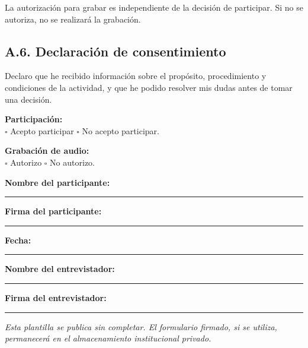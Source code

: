\documentclass[12pt,a4paper]{article}
\begin{document}
La autorización para grabar es independiente de la decisión
de participar. Si no se autoriza, no se realizará la grabación.

\subsection*{A.6. Declaración de consentimiento}

Declaro que he recibido información sobre el propósito,
procedimiento y condiciones de la actividad, y que he podido
resolver mis dudas antes de tomar una decisión.

\vspace{0.3cm}

\noindent\textbf{Participación:}\\[0.15cm]
$\square$ Acepto participar \qquad
$\square$ No acepto participar.

\vspace{0.3cm}

\noindent\textbf{Grabación de audio:}\\[0.15cm]
$\square$ Autorizo \qquad
$\square$ No autorizo.

\vspace{0.15cm}

\noindent\textbf{Nombre del participante:}
\rule{7cm}{0.4pt}

\vspace{0.15cm}

\noindent\textbf{Firma del participante:}
\rule{7.3cm}{0.4pt}

\vspace{0.15cm}

\noindent\textbf{Fecha:}
\rule{5cm}{0.4pt}

\vspace{0.15cm}

\noindent\textbf{Nombre del entrevistador:}
\rule{7cm}{0.4pt}

\vspace{0.15cm}

\noindent\textbf{Firma del entrevistador:}
\rule{7.3cm}{0.4pt}

\vfill

\begin{center}
\footnotesize\itshape
Esta plantilla se publica sin completar.
El formulario firmado, si se utiliza, permanecerá
en el almacenamiento institucional privado.
\end{center}
\end{document}
